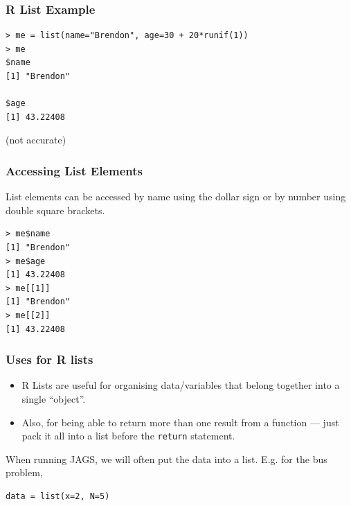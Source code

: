 \documentclass{beamer}
\begin{document}
\begin{frame}[fragile]
\frametitle{R List Example}
\begin{verbatim}
> me = list(name="Brendon", age=30 + 20*runif(1))
> me
$name
[1] "Brendon"

$age
[1] 43.22408
\end{verbatim}
(not accurate)
\end{frame}


\begin{frame}[fragile]
\frametitle{Accessing List Elements}
List elements can be accessed by name using the dollar sign
or by number using double square brackets.
\begin{verbatim}
> me$name
[1] "Brendon"
> me$age
[1] 43.22408
> me[[1]]
[1] "Brendon"
> me[[2]]
[1] 43.22408
\end{verbatim}
\end{frame}


\begin{frame}[fragile]
\frametitle{Uses for R lists}
\begin{itemize}
\item R Lists are useful for organising data/variables that
belong together into a single ``object''.\pause
\item Also, for being able to return more than one result from
a function --- just pack it all into a list before the
\texttt{return} statement.
\end{itemize}

\pause
When running JAGS, we will often put the data into a list.
E.g. for the bus problem,
\begin{verbatim}
data = list(x=2, N=5)
\end{verbatim}
\end{frame}
\end{document}
